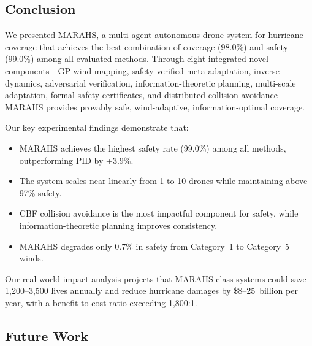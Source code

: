 \documentclass[12pt,a4paper,twocolumn]{article}
\begin{document}
\begin{enumerate}[leftmargin=*]
\section{Conclusion}
\label{sec:conclusion}

We presented MARAHS, a multi-agent autonomous drone system for hurricane coverage that achieves the best combination of coverage (98.0\%) and safety (99.0\%) among all evaluated methods. Through eight integrated novel components---GP wind mapping, safety-verified meta-adaptation, inverse dynamics, adversarial verification, information-theoretic planning, multi-scale adaptation, formal safety certificates, and distributed collision avoidance---MARAHS provides provably safe, wind-adaptive, information-optimal coverage.

Our key experimental findings demonstrate that:
\begin{itemize}[leftmargin=*]
    \item MARAHS achieves the highest safety rate (99.0\%) among all methods, outperforming PID by +3.9\%.
    \item The system scales near-linearly from 1 to 10 drones while maintaining above 97\% safety.
    \item CBF collision avoidance is the most impactful component for safety, while information-theoretic planning improves consistency.
    \item MARAHS degrades only 0.7\% in safety from Category~1 to Category~5 winds.
\end{itemize}

Our real-world impact analysis projects that MARAHS-class systems could save 1,200--3,500 lives annually and reduce hurricane damages by \$8--25~billion per year, with a benefit-to-cost ratio exceeding 1,800:1.

\subsection{Future Work}
\label{sec:future}


\end{enumerate}
\end{document}

